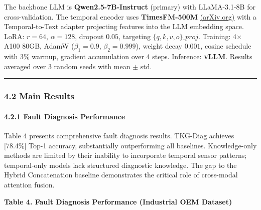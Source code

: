 \documentclass[
  11pt,
]{article}
\begin{document}
The backbone LLM is \textbf{Qwen2.5-7B-Instruct} (primary) with
LLaMA-3.1-8B for cross-validation. The temporal encoder uses
\textbf{TimesFM-500M}
\href{https://arxiv.org/html/2506.22039v2}{(arXiv.org)} with a
Temporal-to-Text adapter projecting features into the LLM embedding
space. LoRA: \(r=64\), \(\alpha=128\), dropout \(0.05\), targeting
\(\{q, k, v, o\}\_proj\). Training: 4× A100 80GB, AdamW
(\(\beta_1=0.9\), \(\beta_2=0.999\)), weight decay \(0.001\), cosine
schedule with 3\% warmup, gradient accumulation over 4 steps. Inference:
\textbf{vLLM}. Results averaged over 3 random seeds with mean \(\pm\)
std.

\begin{center}\rule{0.5\linewidth}{0.5pt}\end{center}

\subsubsection{4.2 Main Results}\label{main-results}

\paragraph{4.2.1 Fault Diagnosis
Performance}\label{fault-diagnosis-performance}

Table 4 presents comprehensive fault diagnosis results. TKG-Diag
achieves {[}78.4\%{]} Top-1 accuracy, substantially outperforming all
baselines. Knowledge-only methods are limited by their inability to
incorporate temporal sensor patterns; temporal-only models lack
structured diagnostic knowledge. The gap to the Hybrid Concatenation
baseline demonstrates the critical role of cross-modal attention fusion.

\textbf{Table 4. Fault Diagnosis Performance (Industrial OEM Dataset)}
\end{document}

